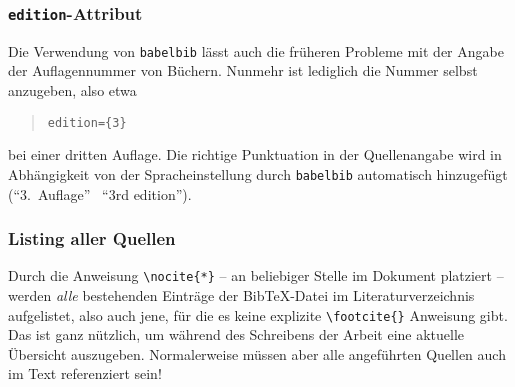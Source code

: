 \subsubsection{\texttt{edition}-Attribut}

Die Verwendung von \verb!babelbib! lässt auch die früheren Probleme mit der
Angabe der Auflagennummer von Büchern. Nunmehr ist lediglich die Nummer selbst anzugeben, also etwa
\begin{quote}
\verb!edition={3}!
\end{quote}
bei einer dritten Auflage. Die richtige Punktuation in der Quellenangabe wird in Abhängigkeit von der Spracheinstellung durch \texttt{babelbib} automatisch hinzugefügt ("`3.\ Auflage"' \bzw\ "`3rd edition"').


\subsubsection{Listing aller Quellen}

Durch die Anweisung \verb!\nocite{*}! -- an beliebiger Stelle im Dokument platziert -- werden \emph{alle} bestehenden Einträge der BibTeX-Datei im Literaturverzeichnis aufgelistet, also auch jene, für die es keine explizite \verb!\footcite{}! Anweisung gibt. Das ist ganz nützlich, um während des Schreibens der Arbeit eine aktuelle Übersicht auszugeben. Normalerweise müssen aber alle angeführten Quellen auch im Text referenziert sein!

